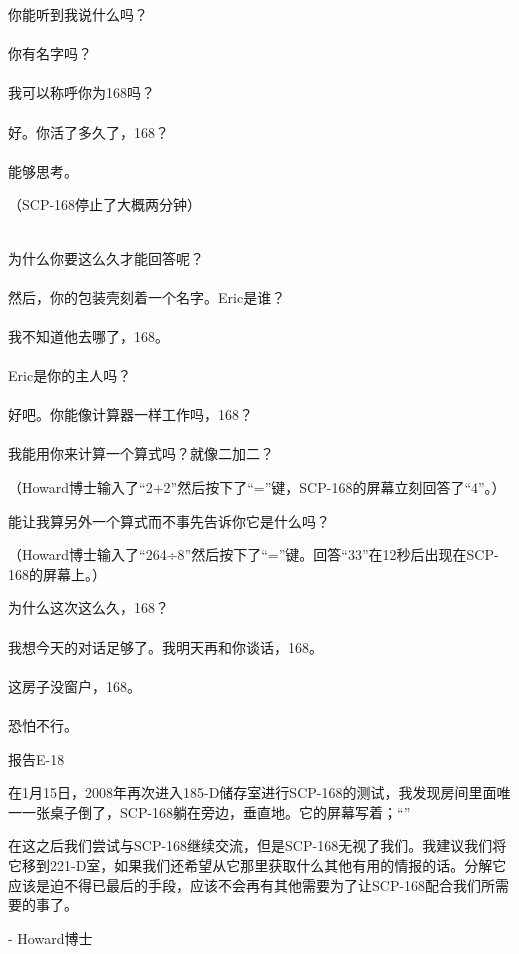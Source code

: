 你能听到我说什么吗？\\
\\
你有名字吗？\\
\\
我可以称呼你为168吗？\\
\\
好。你活了多久了，168？\\
\\
能够思考。\\

（SCP-168停止了大概两分钟）

\\
为什么你要这么久才能回答呢？\\
\\
然后，你的包装壳刻着一个名字。Eric是谁？\\
\\
我不知道他去哪了，168。\\
\\
Eric是你的主人吗？\\
\\
好吧。你能像计算器一样工作吗，168？\\
\\
我能用你来计算一个算式吗？就像二加二？\\

（Howard博士输入了“2+2”然后按下了“=”键，SCP-168的屏幕立刻回答了“4”。）

能让我算另外一个算式而不事先告诉你它是什么吗？\\

（Howard博士输入了“264÷8”然后按下了“=”键。回答“33”在12秒后出现在SCP-168的屏幕上。）

为什么这次这么久，168？\\
\\
我想今天的对话足够了。我明天再和你谈话，168。\\
\\
这房子没窗户，168。\\
\\
恐怕不行。\\


报告E-18

在1月15日，2008年再次进入185-D储存室进行SCP-168的测试，我发现房间里面唯一一张桌子倒了，SCP-168躺在旁边，垂直地。它的屏幕写着；“”

在这之后我们尝试与SCP-168继续交流，但是SCP-168无视了我们。我建议我们将它移到221-D室，如果我们还希望从它那里获取什么其他有用的情报的话。分解它应该是迫不得已最后的手段，应该不会再有其他需要为了让SCP-168配合我们所需要的事了。

- Howard博士
